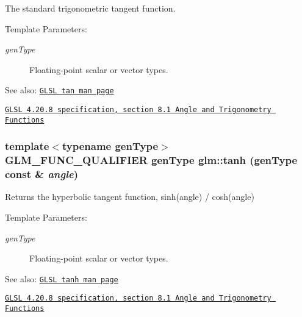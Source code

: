 The standard trigonometric tangent function.

\begin{Desc}
\item[Template Parameters:]
\begin{description}
\item[{\em genType}]Floating-point scalar or vector types.\end{description}
\end{Desc}
\begin{Desc}
\item[See also:]\href{http://www.opengl.org/sdk/docs/manglsl/xhtml/tan.xml}{\tt GLSL tan man page} 

\href{http://www.opengl.org/registry/doc/GLSLangSpec.4.20.8.pdf}{\tt GLSL 4.20.8 specification, section 8.1 Angle and Trigonometry Functions} \end{Desc}
\hypertarget{group__core__func__trigonometric_gaa29bdd7f3b57755a7b6a9834d59887f}{
\subsubsection[tanh]{\setlength{\rightskip}{0pt plus 5cm}template$<$typename genType$>$ GLM\_\-FUNC\_\-QUALIFIER genType glm::tanh (genType const \& {\em angle})}}
\label{group__core__func__trigonometric_gaa29bdd7f3b57755a7b6a9834d59887f}


Returns the hyperbolic tangent function, sinh(angle) / cosh(angle)

\begin{Desc}
\item[Template Parameters:]
\begin{description}
\item[{\em genType}]Floating-point scalar or vector types.\end{description}
\end{Desc}
\begin{Desc}
\item[See also:]\href{http://www.opengl.org/sdk/docs/manglsl/xhtml/tanh.xml}{\tt GLSL tanh man page} 

\href{http://www.opengl.org/registry/doc/GLSLangSpec.4.20.8.pdf}{\tt GLSL 4.20.8 specification, section 8.1 Angle and Trigonometry Functions} \end{Desc}
